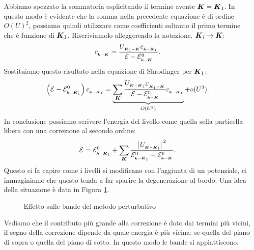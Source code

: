 Abbiamo spezzato la sommatoria esplicitando il termine avente $\boldsymbol{K} = \boldsymbol{K}_1$. In questo modo è evidente che la somma nella precedente equazione è di ordine $O(U)^2$, possiamo quindi utilizzare come coefficienti soltanto il primo termine che è funzione di $\boldsymbol{K}_1$. Riscriviamolo alleggerendo la notazione, $\boldsymbol{K}_i \to \boldsymbol{K}$:
\[
	c_{_{\boldsymbol{k}-\boldsymbol{K}}} = 
	\frac{U_{_{\boldsymbol{K}_1-\boldsymbol{K}}}c_{_{\boldsymbol{k}-\boldsymbol{K}_1}}}
	{\mathcal{E}-\mathcal{E}^0_{_{\boldsymbol{k}-\boldsymbol{K}}}}
.\] 
Sostituiamo questo risultato nella equazione di Shrodinger per $\boldsymbol{K}_1$:
\[
	\left( \mathcal{E}-\mathcal{E}^0_{_{\boldsymbol{k}-\boldsymbol{K}_1}} \right) 
	c_{_{\boldsymbol{k}-\boldsymbol{K}_1}} 
	=
	\underbrace{
	\sum_{\boldsymbol{K}}^{} \frac{U_{_{\boldsymbol{K}-\boldsymbol{K}_1}U_{_{\boldsymbol{K}_1-\boldsymbol{K}}}}}
	{\mathcal{E}-\mathcal{E}^0_{_{\boldsymbol{k}-\boldsymbol{K}}}}
	c_{_{\boldsymbol{k}-\boldsymbol{K}_1}}
	}_{O(U^2)}
	 + o(U^3)
.\] 
In conclusione possiamo scrivere l'energia del livello come quella sella particella libera con una correzione al secondo ordine:
\[
	\mathcal{E} 
	=
	\mathcal{E}^0_{_{\boldsymbol{k}-\boldsymbol{K}_1}} 
	+
	\sum_{\boldsymbol{K}}^{} \frac{\left| U_{_{\boldsymbol{K}-\boldsymbol{K}_1}} \right|^2}
	{\mathcal{E}^0_{_{\boldsymbol{k}-\boldsymbol{K}_1}}-\mathcal{E}^0_{_{\boldsymbol{k}-\boldsymbol{K}}}}
.\] 
Questo ci fa capire come i livelli si modificano con l'aggiunta di un potenziale, ci immaginiamo che questo tenda a far sparire la degenerazione al bordo. Una idea della situazione è data in Figura \ref{fig:effetto-sulle-bande-del-metodo-perturbativo}. 
\begin{figure}[ht]
    \centering
    \caption{Effetto sulle bande del metodo perturbativo}
    \label{fig:effetto-sulle-bande-del-metodo-perturbativo}
\end{figure}
Vediamo che il contributo più grande alla correzione è dato dai termini più vicini, il segno della correzione dipende da quale energia è più vicina: se quella del piano di sopra o quella del piano di sotto. In questo modo le bande si appiattiscono.
